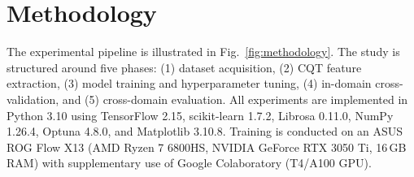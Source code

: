 \documentclass[pdflatex,sn-mathphys-num,iicol]{sn-jnl}
\theoremstyle{thmstyleone}
\theoremstyle{thmstyletwo}
\theoremstyle{thmstylethree}
\begin{document}
\section{Methodology}\label{sec3}

The experimental pipeline is illustrated in Fig.~\ref{fig:methodology}. The study is structured around five phases: (1) dataset acquisition, (2) CQT feature extraction, (3) model training and hyperparameter tuning, (4) in-domain cross-validation, and (5) cross-domain evaluation. All experiments are implemented in Python 3.10 using TensorFlow 2.15, scikit-learn 1.7.2, Librosa 0.11.0, NumPy 1.26.4, Optuna 4.8.0, and Matplotlib 3.10.8. Training is conducted on an ASUS ROG Flow X13 (AMD Ryzen 7 6800HS, NVIDIA GeForce RTX 3050 Ti, 16\,GB RAM) with supplementary use of Google Colaboratory (T4/A100 GPU).
\end{document}
